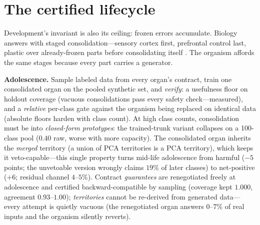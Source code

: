 \documentclass{article}
\begin{document}
\section{The certified lifecycle}\label{sec:lifecycle}
Development's invariant is also its ceiling: frozen errors accumulate. Biology
answers with staged consolidation---sensory cortex first, prefrontal control
last, plastic over already-frozen parts before consolidating itself
\citep{gogtay2004dynamic}. The organism affords the same stages because every
part carries a generator.

\textbf{Adolescence.} Sample labeled data from every organ's contract, train
one consolidated organ on the pooled synthetic set, and \emph{verify}: a
usefulness floor on holdout coverage (vacuous consolidations pass every safety
check---measured), and a \emph{relative} per-class gate against the organism
being replaced on identical data (absolute floors harden with class count).
At high class counts, consolidation must be into \emph{closed-form
prototypes}: the trained-trunk variant collapses on a 100-class pool ($0.40$
raw, worse with more capacity). The consolidated organ inherits the
\emph{merged} territory (a union of PCA territories is a PCA territory), which
keeps it veto-capable---this single property turns mid-life adolescence from
harmful ($-5$ points; the unvetoable version wrongly claims $19\%$ of later
classes) to net-positive ($+6$; residual channel $4$--$5\%$). Contract
\emph{guarantees} are renegotiated freely at adolescence and certified
backward-compatible by sampling (coverage kept $1.000$, agreement
$0.93$--$1.00$); \emph{territories} cannot be re-derived from generated
data---every attempt is quietly vacuous (the renegotiated organ answers
$0$--$7\%$ of real inputs and the organism silently reverts).
\end{document}
